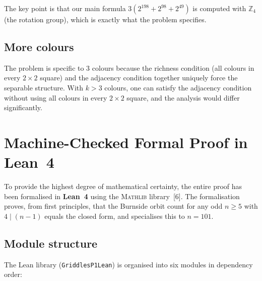 \documentclass{article}
\begin{document}
The key point is that our main formula
$3(2^{198}+2^{98}+2^{49})$ is computed with $\mathbb{Z}_4$
(the rotation group), which is exactly what the problem
specifies.

\subsection{More colours}

The problem is specific to 3 colours because the richness
condition (all colours in every $2\times 2$ square) and the
adjacency condition together uniquely force the separable
structure.  With $k>3$ colours, one can satisfy the adjacency
condition without using all colours in every $2\times 2$
square, and the analysis would differ significantly.

\section{Machine-Checked Formal Proof in Lean~4}
\label{sec:lean}

To provide the highest degree of mathematical certainty,
the entire proof has been formalised in \textbf{Lean~4}
using the \textsc{Mathlib} library~[6].
The formalisation proves, from first principles, that the
Burnside orbit count for any odd $n\geq 5$ with $4\mid(n-1)$
equals the closed form, and specialises this to $n=101$.

\subsection{Module structure}

The Lean library (\texttt{GriddlesP1Lean}) is organised
into six modules in dependency order:
\end{document}

